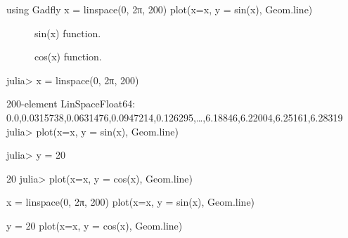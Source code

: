 \begin{juliacode}
using Gadfly
x = linspace(0, 2π, 200)
plot(x=x, y = sin(x), Geom.line)
\end{juliacode}
\begin{figure}[ht]
\center
\resizebox{\linewidth}{!}{}
\caption{sin(x) function.}
\label{fig:sin_fun}
\end{figure}

\begin{figure}[htpb]
\center
\resizebox{\linewidth}{!}{}
\caption{cos(x) function.}
\end{figure}

\resizebox{\linewidth}{!}{}

\begin{juliaterm}
julia> x = linspace(0, 2π, 200)

200-element LinSpace{Float64}:
 0.0,0.0315738,0.0631476,0.0947214,0.126295,…,6.18846,6.22004,6.25161,6.28319
julia> plot(x=x, y = sin(x), Geom.line)

\end{juliaterm}
\resizebox{\linewidth}{!}{}

\begin{juliaterm}
julia> y = 20

20
julia> plot(x=x, y = cos(x), Geom.line)
\end{juliaterm}
\resizebox{\linewidth}{!}{}

\begin{juliacode}
x = linspace(0, 2π, 200)
plot(x=x, y = sin(x), Geom.line)
\end{juliacode}
\resizebox{15cm}{!}{}

\begin{juliacode}
y = 20
plot(x=x, y = cos(x), Geom.line)
\end{juliacode}
\resizebox{15cm}{!}{}
